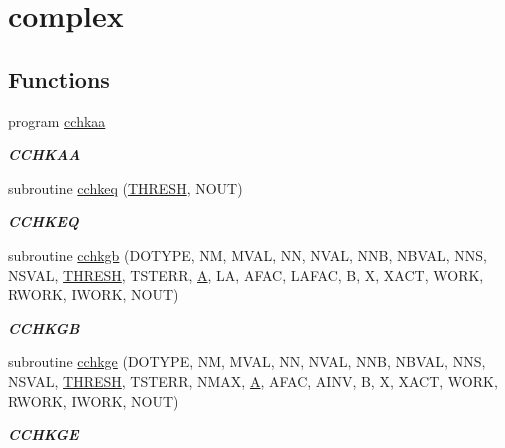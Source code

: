 \hypertarget{group__complex__lin}{}\section{complex}
\label{group__complex__lin}
\subsection*{Functions}
\begin{DoxyCompactItemize}
\item 
program \hyperlink{group__complex__lin_ga87bc5eca56916f20bb104be3e18bcda0}{cchkaa}
\begin{DoxyCompactList}\small\item\em {\bfseries C\+C\+H\+K\+A\+A} \end{DoxyCompactList}\item 
subroutine \hyperlink{group__complex__lin_gaa9b033e4eae8202164537a440c6f863e}{cchkeq} (\hyperlink{zlaqgs_8c_a0656018abfc9fa2821827415f5d5ea57}{T\+H\+R\+E\+S\+H}, N\+O\+U\+T)
\begin{DoxyCompactList}\small\item\em {\bfseries C\+C\+H\+K\+E\+Q} \end{DoxyCompactList}\item 
subroutine \hyperlink{group__complex__lin_ga9d53542bdb952017d1005904b47a995c}{cchkgb} (D\+O\+T\+Y\+P\+E, N\+M, M\+V\+A\+L, N\+N, N\+V\+A\+L, N\+N\+B, N\+B\+V\+A\+L, N\+N\+S, N\+S\+V\+A\+L, \hyperlink{zlaqgs_8c_a0656018abfc9fa2821827415f5d5ea57}{T\+H\+R\+E\+S\+H}, T\+S\+T\+E\+R\+R, \hyperlink{classA}{A}, L\+A, A\+F\+A\+C, L\+A\+F\+A\+C, B, X, X\+A\+C\+T, W\+O\+R\+K, R\+W\+O\+R\+K, I\+W\+O\+R\+K, N\+O\+U\+T)
\begin{DoxyCompactList}\small\item\em {\bfseries C\+C\+H\+K\+G\+B} \end{DoxyCompactList}\item 
subroutine \hyperlink{group__complex__lin_ga36602aa1f10746af95587aad599870cc}{cchkge} (D\+O\+T\+Y\+P\+E, N\+M, M\+V\+A\+L, N\+N, N\+V\+A\+L, N\+N\+B, N\+B\+V\+A\+L, N\+N\+S, N\+S\+V\+A\+L, \hyperlink{zlaqgs_8c_a0656018abfc9fa2821827415f5d5ea57}{T\+H\+R\+E\+S\+H}, T\+S\+T\+E\+R\+R, N\+M\+A\+X, \hyperlink{classA}{A}, A\+F\+A\+C, A\+I\+N\+V, B, X, X\+A\+C\+T, W\+O\+R\+K, R\+W\+O\+R\+K, I\+W\+O\+R\+K, N\+O\+U\+T)
\begin{DoxyCompactList}\small\item\em {\bfseries C\+C\+H\+K\+G\+E} \end{DoxyCompactList}\item 

\end{DoxyCompactItemize}
